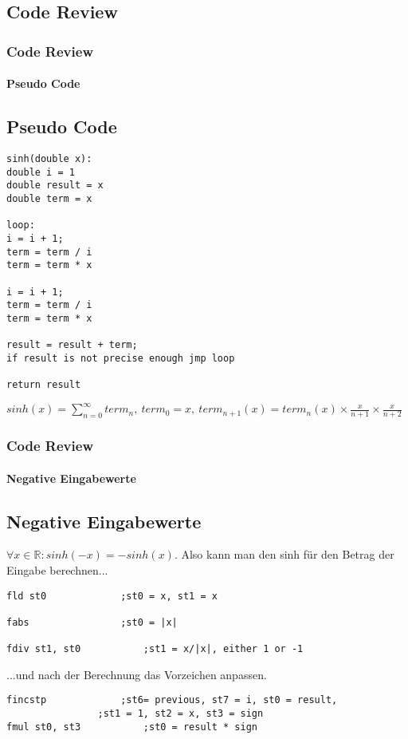 	\begin{frame}[fragile]
		\section{Code Review}
		\frametitle{Code Review}
		\framesubtitle{Pseudo Code}
		\subsection{Pseudo Code}
\begin{lstlisting}[style=myPseudo, title=Sinh in Pseudocode]
sinh(double x):
double i = 1
double result = x
double term = x

loop:
i = i + 1;
term = term / i
term = term * x

i = i + 1;
term = term / i
term = term * x

result = result + term;
if result is not precise enough jmp loop

return result
\end{lstlisting}
$sinh(x) = \sum\limits_{n=0}^{\infty} term_{n}, \ term_{0} = x, \ term_{n+1}(x) = term_{n}(x) \times \frac{x}{n+1} \times \frac{x}{n+2}$
\end{frame}
\begin{frame}[fragile]
\frametitle{Code Review}
\framesubtitle{Negative Eingabewerte}
\subsection{Negative Eingabewerte}
$\forall x \in \mathbb{R}: sinh(-x) = -sinh(x)$. Also kann man den sinh für den Betrag der Eingabe berechnen...
\begin{lstlisting}[style=myAssembly, title=sinh.asm vor Aufruf der Hauptschleife, firstnumber = 22]
fld st0				;st0 = x, st1 = x

fabs				;st0 = |x|

fdiv st1, st0			;st1 = x/|x|, either 1 or -1
\end{lstlisting}
...und nach der Berechnung das Vorzeichen anpassen.
\begin{lstlisting}[style=myAssembly, title=sinh.asm nach Verlassen der Hauptschleife, firstnumber = 83]
fincstp				;st6= previous, st7 = i, st0 = result, 
				;st1 = 1, st2 = x, st3 = sign
fmul st0, st3			;st0 = result * sign
\end{lstlisting}
\end{frame}
